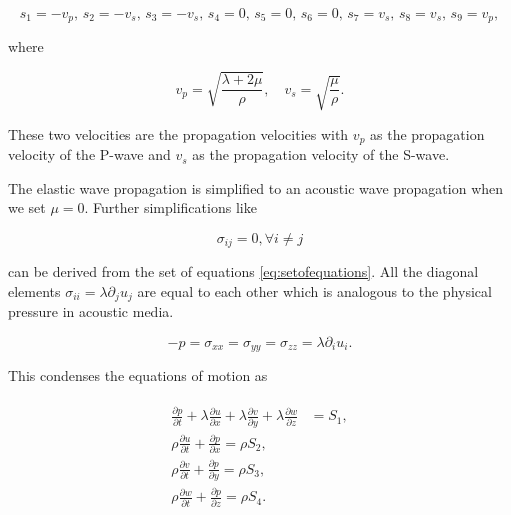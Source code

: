 \begin{equation}
    s_1 = -v_p, \, s_2 = -v_s, \, s_3 = -v_s, \, s_4=0, \, s_5 = 0, \, s_6 = 0, \, s_7 = v_s, \, s_8 = v_s, \, s_9 = v_p,
\end{equation}

where

\begin{equation}
    v_p = \sqrt{\frac{\lambda + 2\mu}{\rho}}, \quad v_s = \sqrt{\frac{\mu}{\rho}}.
    \label{eq:wavevelocities}
\end{equation}

These two velocities are the propagation velocities with $v_p$ as the propagation velocity of the P-wave and $v_s$ as the propagation velocity of the S-wave.

The elastic wave propagation is simplified to an acoustic wave propagation when we set $\mu = 0$. Further simplifications like

\begin{equation}
    \sigma_{ij} = 0, \forall i \neq j
\end{equation}

can be derived from the set of equations \ref{eq:setofequations}. All the diagonal elements $\sigma_{ii} = \lambda \partial_j u_j$
are equal to each other which is analogous to the physical pressure in acoustic media. 

\begin{equation}
    -p = \sigma_{xx} = \sigma_{yy} = \sigma_{zz} = \lambda \partial_iu_i .
\end{equation}


This condenses the equations of motion as

\begin{align}
    \begin{split}
        \frac{\partial p}{\partial t} + \lambda \frac{\partial u}{\partial x} + \lambda \frac{\partial v}{\partial y} + \lambda \frac{\partial w}{\partial z} &= S_1, \\
        \rho \frac{\partial u}{\partial t} + \frac{\partial p}{\partial x} = \rho S_2, \\
        \rho \frac{\partial v}{\partial t} + \frac{\partial p}{\partial y} = \rho S_3, \\
        \rho \frac{\partial w}{\partial t} + \frac{\partial p}{\partial z} = \rho S_4. \\
    \end{split}
    \label{eq:acousticequations}
\end{align}

